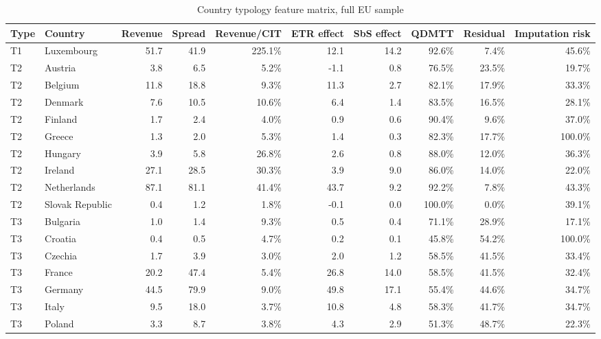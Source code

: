 \begin{table}[H]
\centering
\scriptsize
\caption{Country typology feature matrix, full EU sample}
\label{tab:app_country_typology_features}
\begin{adjustbox}{max width=\textwidth,center}
\begin{tabular}{@{}llrrrrrrrr@{}}
\toprule
Type & Country & Revenue & Spread & Revenue/CIT & ETR effect & SbS effect & QDMTT & Residual & Imputation risk \\
\midrule
T1 & Luxembourg & 51.7 & 41.9 & 225.1\% & 12.1 & 14.2 &  92.6\% &  7.4\% &  45.6\% \\
T2 & Austria &  3.8 &  6.5 &   5.2\% & -1.1 &  0.8 &  76.5\% & 23.5\% &  19.7\% \\
T2 & Belgium & 11.8 & 18.8 &   9.3\% & 11.3 &  2.7 &  82.1\% & 17.9\% &  33.3\% \\
T2 & Denmark &  7.6 & 10.5 &  10.6\% &  6.4 &  1.4 &  83.5\% & 16.5\% &  28.1\% \\
T2 & Finland &  1.7 &  2.4 &   4.0\% &  0.9 &  0.6 &  90.4\% &  9.6\% &  37.0\% \\
T2 & Greece &  1.3 &  2.0 &   5.3\% &  1.4 &  0.3 &  82.3\% & 17.7\% & 100.0\% \\
T2 & Hungary &  3.9 &  5.8 &  26.8\% &  2.6 &  0.8 &  88.0\% & 12.0\% &  36.3\% \\
T2 & Ireland & 27.1 & 28.5 &  30.3\% &  3.9 &  9.0 &  86.0\% & 14.0\% &  22.0\% \\
T2 & Netherlands & 87.1 & 81.1 &  41.4\% & 43.7 &  9.2 &  92.2\% &  7.8\% &  43.3\% \\
T2 & Slovak Republic &  0.4 &  1.2 &   1.8\% & -0.1 &  0.0 & 100.0\% &  0.0\% &  39.1\% \\
T3 & Bulgaria &  1.0 &  1.4 &   9.3\% &  0.5 &  0.4 &  71.1\% & 28.9\% &  17.1\% \\
T3 & Croatia &  0.4 &  0.5 &   4.7\% &  0.2 &  0.1 &  45.8\% & 54.2\% & 100.0\% \\
T3 & Czechia &  1.7 &  3.9 &   3.0\% &  2.0 &  1.2 &  58.5\% & 41.5\% &  33.4\% \\
T3 & France & 20.2 & 47.4 &   5.4\% & 26.8 & 14.0 &  58.5\% & 41.5\% &  32.4\% \\
T3 & Germany & 44.5 & 79.9 &   9.0\% & 49.8 & 17.1 &  55.4\% & 44.6\% &  34.7\% \\
T3 & Italy &  9.5 & 18.0 &   3.7\% & 10.8 &  4.8 &  58.3\% & 41.7\% &  34.7\% \\
T3 & Poland &  3.3 &  8.7 &   3.8\% &  4.3 &  2.9 &  51.3\% & 48.7\% &  22.3\% \\

\end{tabular}
\end{adjustbox}
\end{table}
